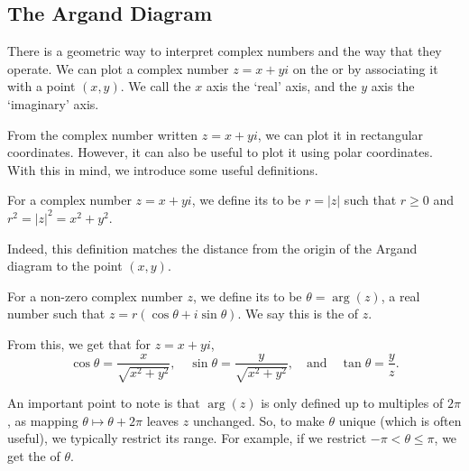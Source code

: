 \subsection{The Argand Diagram}

There is a geometric way to interpret complex numbers and the way that they operate. We can plot a complex number $z = x + yi$ on the  or  by associating it with a point $(x, y)$. We call the $x$ axis the `real' axis, and the $y$ axis the `imaginary' axis.

\begin{center}
\end{center}

From the complex number written $z= x + yi$, we can plot it in rectangular coordinates. However, it can also be useful to plot it using polar coordinates. With this in mind, we introduce some useful 
definitions.

\begin{definition}[Modulus]
	For a complex number $z = x + yi$, we define its  to be $r = |z|$ such that $r \geq 0$ and $r^2 = |z|^2 = x^2 + y^2$.
\end{definition}

Indeed, this definition matches the distance from the origin of the Argand diagram to the point $(x, y)$.

\begin{definition}[Argument]
	For a non-zero complex number $z$, we define its  to be $\theta = \arg(z)$, a real number such that $z = r(\cos \theta + i \sin \theta)$. We say this is the  of $z$.
\end{definition}

From this, we get that for $z = x + yi$,
$$
\cos \theta = \frac{x}{\sqrt{x^2 + y^2}}, \quad \sin \theta = \frac{y}{\sqrt{x^2 + y^2}}, \quad \text{and} \quad \tan \theta = \frac{y}{z}.
$$

An important point to note is that $\arg(z)$ is only defined up to multiples of $2 \pi$, as mapping $\theta \mapsto \theta + 2\pi$ leaves $z$ unchanged. So, to make $\theta$ unique (which is often useful), we typically restrict its range. For example, if we restrict $- \pi < \theta \leq \pi$, we get the  of $\theta$.

